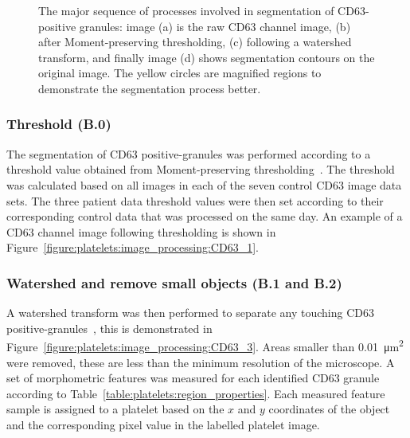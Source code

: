 \begin{figure}[htbp]
\begin{subfigure}[b]{0.45\linewidth}
		\caption{}
		\label{figure:platelets:image_processing:CD63_4}
		\vspace{1ex}
	\end{subfigure}
	\caption[CD63 positive-granule segmentation]{The major sequence of processes involved in segmentation of CD63-positive granules: image (a) is the raw CD63 channel image, (b) after Moment-preserving thresholding, (c) following a watershed transform, and finally image (d) shows segmentation contours on the original image. The yellow circles are magnified regions to demonstrate the segmentation process better.}
	\label{figure:image_processing:granules}
\end{figure}

\subsubsection{Threshold (B.0)}
The segmentation of CD63 positive-granules was performed according to a threshold value obtained from Moment-preserving thresholding~\cite{Tsai1985}. The threshold was calculated based on all images in each of the seven control CD63 image data sets. The three patient data threshold values were then set according to their corresponding control data that was processed on the same day. An example of a CD63 channel image following thresholding is shown in Figure~\ref{figure:platelets:image_processing:CD63_1}.

\subsubsection{Watershed and remove small objects (B.1 and B.2)}
A watershed transform was then performed to separate any touching CD63 positive-granules~\cite{Vincent1991}, this is demonstrated in Figure~\ref{figure:platelets:image_processing:CD63_3}. Areas smaller than \SI{0.01}{\micro\meter\squared} were removed, these are less than the minimum resolution of the microscope. A set of morphometric features was measured for each identified CD63 granule according to Table~\ref{table:platelets:region_properties}. Each measured feature sample is assigned to a platelet based on the $x$ and $y$ coordinates of the object and the corresponding pixel value in the labelled platelet image.

